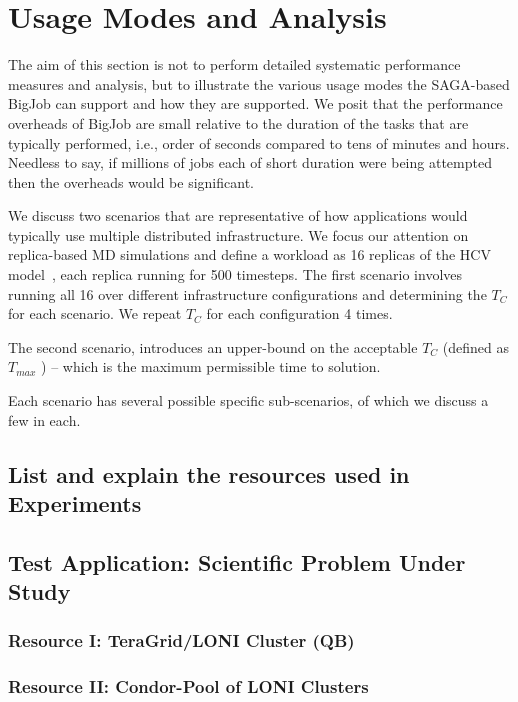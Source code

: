 \documentclass[conference,final]{IEEEtran}
\newcommand{\numrep}{16 }
\newcommand{\samplenum}{4 }
\newcommand{\tmax}{$T_{max}$ }
\newcommand{\tc}{$T_{C}$ }
\begin{document}
\section{Usage Modes and Analysis}

The aim of this section is not to perform detailed systematic
performance measures and analysis, but to illustrate the various usage
modes the SAGA-based BigJob can support and how they are supported. We
posit that the performance overheads of BigJob are small relative to
the duration of the tasks that are typically performed, i.e., order of
seconds compared to tens of minutes and hours.  Needless to say, if
millions of jobs each of short duration were being attempted then the
overheads would be significant.

We discuss two scenarios that are representative of how applications
would typically use multiple distributed infrastructure. We focus our
attention on replica-based MD simulations and define a workload as
\numrep replicas of the HCV model~\cite{}, each replica running for
500 timesteps.  The first scenario involves running all \numrep over
different infrastructure configurations and determining the \tc for
each scenario. We repeat \tc for each configuration \samplenum times.

The second scenario, introduces an upper-bound on the acceptable \tc
(defined as \tmax) -- which is the maximum permissible time to
solution.

Each scenario has several possible specific sub-scenarios, of which we
discuss a few in each.

\subsection{List and explain the resources used in Experiments}

\subsection{Test Application: Scientific Problem Under Study}

\subsubsection*{Resource I: TeraGrid/LONI Cluster (QB)}

\subsubsection*{Resource II: Condor-Pool of LONI Clusters}
\end{document}
